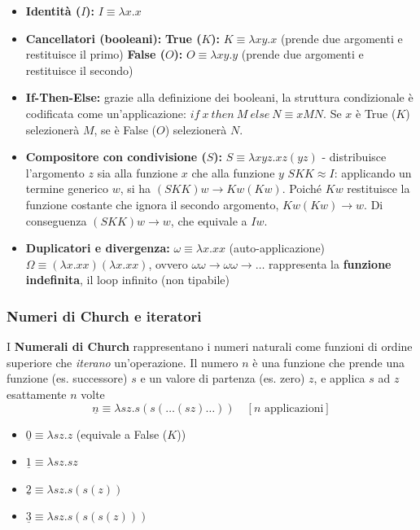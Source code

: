 \begin{itemize}
    \item \textbf{Identità ($I$):} $I \equiv \lambda x.x$
    \item \textbf{Cancellatori (booleani):}
        \subitem \textbf{True ($K$):} $K \equiv \lambda x y. x$ (prende due argomenti e restituisce il primo)
        \subitem \textbf{False ($O$):} $O \equiv \lambda x y. y$ (prende due argomenti e restituisce il secondo)
    \item \textbf{If-Then-Else:} grazie alla definizione dei booleani, la struttura condizionale è codificata come un'applicazione: $if\ x\ then\ M\ else\ N \equiv x M N$. Se $x$ è True ($K$) selezionerà $M$, se è False ($O$) selezionerà $N$.
    \item \textbf{Compositore con condivisione ($S$):} $S \equiv \lambda x y z. x z (y z)$ - distribuisce l'argomento $z$ sia alla funzione $x$ che alla funzione $y$
\subitem $S K K \approx I$: applicando un termine generico $w$, si ha $(S K K) w \rightarrow K w (K w)$. Poiché $K w$ restituisce la funzione costante che ignora il secondo argomento, $K w (K w) \rightarrow w$. Di conseguenza $(S K K) w \rightarrow w$, che equivale a $I w$.
    \item \textbf{Duplicatori e divergenza:} 
        \subitem $\omega \equiv \lambda x.xx$ (auto-applicazione)
        \subitem $\Omega \equiv (\lambda x.xx) (\lambda x.xx)$, ovvero $\omega \omega \rightarrow \omega \omega \rightarrow \dots$ rappresenta la \textbf{funzione indefinita}, il loop infinito (non tipabile)
\end{itemize}

\subsubsection{Numeri di Church e iteratori}
I \textbf{Numerali di Church} rappresentano i numeri naturali come funzioni di ordine superiore che \textit{iterano} un'operazione. Il numero $n$ è una funzione che prende una funzione (es. successore) $s$ e un valore di partenza (es. zero) $z$, e applica $s$ ad $z$ esattamente $n$ volte
$$\underline{n} \equiv \lambda s z. s(s(\dots(sz)\dots)) \quad [n\text{ applicazioni}]$$
\begin{itemize}
    \item $\underline{0} \equiv \lambda s z. z$ (equivale a False ($K$)) 
    \item $\underline{1} \equiv \lambda s z. s z$
    \item $\underline{2} \equiv \lambda s z. s(s(z))$
    \item $\underline{3} \equiv \lambda s z. s(s(s(z)))$
\end{itemize}


